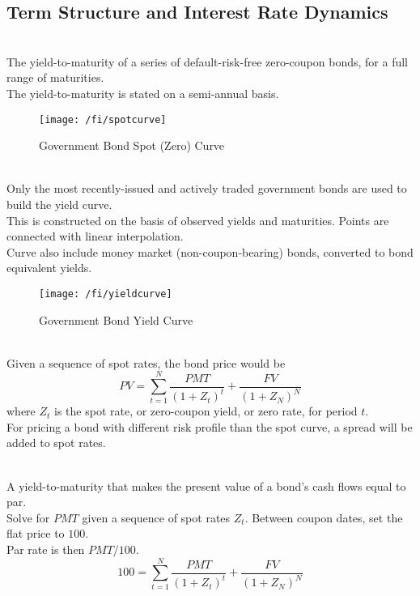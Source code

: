 \subsection{Term Structure and Interest Rate Dynamics}

\begin{definition} \\
The yield-to-maturity of a series of default-risk-free zero-coupon bonds, for a full range of maturities.\\
The yield-to-maturity is stated on a semi-annual basis.
\end{definition}

\begin{figure}[H]
\centering
\texttt{[image: /fi/spotcurve]}
\caption{Government Bond Spot (Zero) Curve}
\end{figure}

\begin{definition} \\
Only the most recently-issued and actively traded government bonds are used to build the yield curve.\\
This is constructed on the basis of observed yields and maturities. Points are connected with linear interpolation.\\
Curve also include money market (non-coupon-bearing) bonds, converted to bond equivalent yields.
\end{definition}

\begin{figure}[H]
\centering
\texttt{[image: /fi/yieldcurve]}
\caption{Government Bond Yield Curve}
\end{figure}

\begin{method} \\
Given a sequence of spot rates, the bond price would be
\begin{equation}
PV = \sum\limits_{t=1}^N \frac{PMT}{(1+Z_t)^t} + \frac{FV}{(1+Z_N)^N} \nonumber
\end{equation}
where $Z_t$ is the spot rate, or zero-coupon yield, or zero rate, for period $t$.\\
For pricing a bond with different risk profile than the spot curve, a spread will be added to spot rates.
\end{method}

\begin{method} \\
A yield-to-maturity that makes the present value of a bond’s cash flows equal to par.\\
Solve for $PMT$ given a sequence of spot rates $Z_t$. Between coupon dates, set the flat price to $100$.\\
Par rate is then $PMT/100$.
\begin{equation}
100 = \sum\limits_{t=1}^N \frac{PMT}{(1+Z_t)^t} + \frac{FV}{(1+Z_N)^N} \nonumber
\end{equation}
\end{method}


